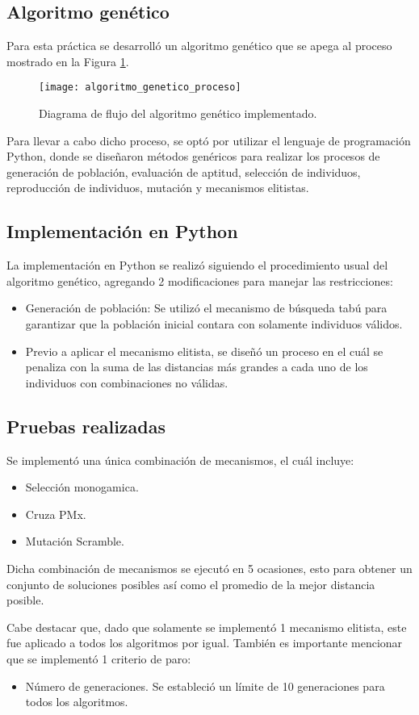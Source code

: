 \subsection{Algoritmo genético}
Para esta práctica se desarrolló un algoritmo genético que se apega al proceso mostrado en la Figura \ref{fig:AG}.

\begin{figure}[htbp]
	\centering
	\texttt{[image: algoritmo\_genetico\_proceso]}
	\caption{Diagrama de flujo del algoritmo genético implementado.}
	\label{fig:AG}
\end{figure}

Para llevar a cabo dicho proceso, se optó por utilizar el lenguaje de programación Python, donde se diseñaron métodos genéricos para realizar los procesos de generación de población, evaluación de aptitud, selección de individuos, reproducción de individuos, mutación y mecanismos elitistas.


\subsection{Implementación en Python}
La implementación en Python se realizó siguiendo el procedimiento usual del algoritmo genético, agregando 2 modificaciones para manejar las restricciones:

\begin{itemize}
	\item Generación de población: Se utilizó el mecanismo de búsqueda tabú para garantizar que la población inicial contara con solamente individuos válidos.
	\item Previo a aplicar el mecanismo elitista, se diseñó un proceso en el cuál se penaliza con la suma de las distancias más grandes a cada uno de los individuos con combinaciones no válidas.
\end{itemize}


\subsection{Pruebas realizadas}
Se implementó una única combinación de mecanismos, el cuál incluye:

\begin{itemize}
	\item Selección monogamica.
	\item Cruza PMx.
	\item Mutación Scramble.
\end{itemize}

Dicha combinación de mecanismos se ejecutó en 5 ocasiones, esto para obtener un conjunto de soluciones posibles así como el promedio de la mejor distancia posible.

Cabe destacar que, dado que solamente se implementó 1 mecanismo elitista, este fue aplicado a todos los algoritmos por igual. También es importante mencionar que se implementó 1 criterio de paro:

\begin{itemize}
	\item Número de generaciones. Se estableció un límite de 10 generaciones para todos los algoritmos.
\end{itemize}
